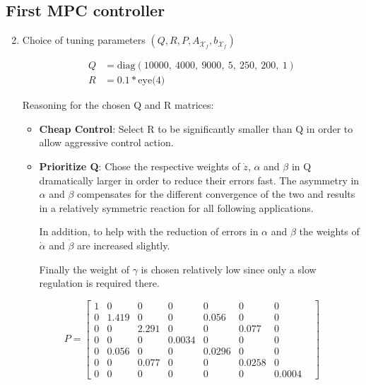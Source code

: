 \documentclass[11pt]{article}
\newcommand{\Xf}{\mathcal{X}_f}
\begin{document}
\newpage
\subsection*{First MPC controller} %
\label{sub:first_mpc_controller}

\begin{enumerate}
    \setcounter{enumi}{1}
    \item Choice of tuning parameters $(Q,R,P,A_{\Xf},b_{\Xf})$
    
    \begin{align}
    Q &= \text{diag}(10000,\ 4000,\ 9000,\ 5,\ 250,\ 200,\ 1)\\
    R &= 0.1*\text{eye(4)}
    \end{align}

	Reasoning for the chosen Q and R matrices:    
    \begin{itemize}
    \item \textbf{Cheap Control}: Select R to be significantly smaller than Q in order to allow aggressive control action.
    \item \textbf{Prioritize Q}: Chose the respective weights of $\dot{z}$, $\alpha$ and $\beta$ in Q dramatically larger in order to reduce their errors fast. The asymmetry in $\alpha$ and $\beta$ compensates for the different convergence of the two and results in a relatively symmetric reaction for all following applications.
    
    \vspace{2ex}
    
    In addition, to help with the reduction of errors in $\alpha$ and $\beta$ the weights of $\dot{\alpha}$ and $\dot{\beta}$ are increased slightly.
    
    \vspace{2ex}
    
    Finally the weight of $\gamma$ is chosen relatively low since only a slow regulation is required there.
    \end{itemize}
    
    \begin{equation}
    P=\begin{bmatrix}1&0&0&0&0&0&0\\0&1.419&0&0&0.056&0&0&\\0&0&2.291&0&0&0.077&0\\0&0&0&0.0034&0&0&0\\0&0.056&0&0&0.0296&0&0\\0&0&0.077&0&0&0.0258&0\\0&0&0&0&0&0&0.0004\end{bmatrix}
    \end{equation}
    

\end{enumerate}
\end{document}
